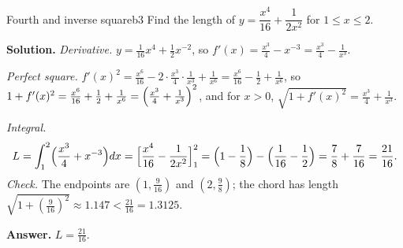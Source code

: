 \documentclass[11pt]{article}
\begin{document}
\begin{exmp}{Fourth and inverse square}{b3}
Find the length of $y=\dfrac{x^4}{16}+\dfrac1{2x^2}$ for $1\le x\le2$.

\textbf{Solution.} \emph{Derivative.} $y=\frac1{16}x^4+\frac12x^{-2}$, so $f'(x)=\frac{x^3}4-x^{-3}=\frac{x^3}4-\frac1{x^3}$.

\emph{Perfect square.} $f'(x)^2=\frac{x^6}{16}-2\cdot\frac{x^3}4\cdot\frac1{x^3}+\frac1{x^6}=\frac{x^6}{16}-\frac12+\frac1{x^6}$, so $1+f'(x)^2=\frac{x^6}{16}+\frac12+\frac1{x^6}=\Bigl(\frac{x^3}4+\frac1{x^3}\Bigr)^2$, and for $x>0$, $\sqrt{1+f'(x)^2}=\frac{x^3}4+\frac1{x^3}$.

\emph{Integral.}
\[
L=\int_1^2\Bigl(\frac{x^3}4+x^{-3}\Bigr)dx=\Bigl[\frac{x^4}{16}-\frac1{2x^2}\Bigr]_1^2=\Bigl(1-\frac18\Bigr)-\Bigl(\frac1{16}-\frac12\Bigr)=\frac78+\frac7{16}=\frac{21}{16} .
\]
\emph{Check.} The endpoints are $(1,\frac9{16})$ and $(2,\frac98)$; the chord has length $\sqrt{1+(\frac9{16})^2}\approx1.147<\frac{21}{16}=1.3125$.

\textbf{Answer.} $L=\frac{21}{16}$.
\end{exmp}
\end{document}
